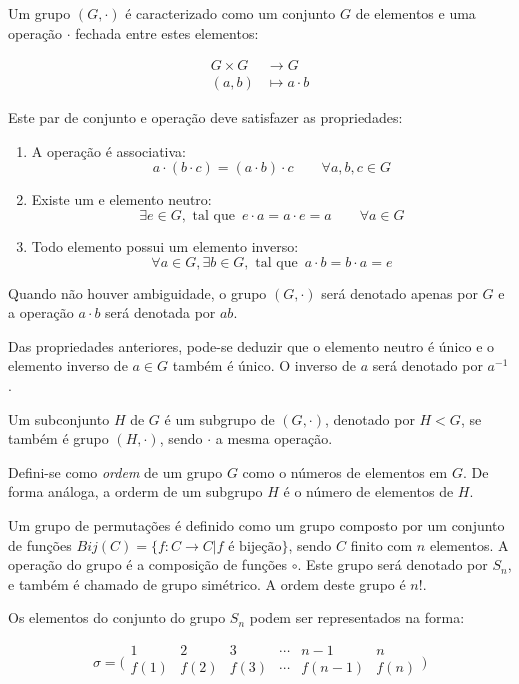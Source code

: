 \documentclass[a4paper,10pt,onecolumn]{article}
\begin{document}
Um grupo $(G,\cdot)$ é caracterizado como um conjunto $G$ de elementos e uma
operação $\cdot$ fechada entre estes elementos:

\begin{align*} G \times G & \rightarrow G \\ (a,b) & \mapsto a \cdot b
\end{align*}

  Este par de conjunto e operação deve satisfazer as propriedades:
\begin{enumerate}
\item A operação é associativa:\\
  $$ a \cdot ( b \cdot c) = ( a \cdot b) \cdot c \qquad \forall a,b,c \in G$$
\item Existe um e elemento neutro:\\
  $$ \exists e \in G, \textrm{ tal que }\, e \cdot a = a \cdot e = a \qquad \forall a \in G $$
\item Todo elemento possui um elemento inverso:\\
  $$ \forall a \in G, \exists b \in G,\textrm{ tal que }\, a \cdot b = b \cdot a = e $$
\end{enumerate}

Quando não houver ambiguidade, o grupo $(G,\cdot)$ será denotado apenas por
$G$ e a operação $a\cdot b$ será denotada por $ab$.

Das propriedades anteriores, pode-se deduzir que o elemento neutro é único e o
elemento inverso de $a \in G$ também é único.  O inverso de $a$ será denotado
por $a^{-1}$.

Um subconjunto $H$ de $G$ é um subgrupo de $(G,\cdot)$, denotado por $H < G$,
se também é grupo $(H,\cdot)$, sendo $\cdot$ a mesma operação.

Defini-se como \emph{ordem} de um grupo $G$ como o números de elementos em
$G$.  De forma análoga, a orderm de um subgrupo $H$ é o número de elementos de $H$.

Um grupo de permutações é definido como um grupo composto por um conjunto de
funções $Bij(C) = \{ f:C \rightarrow C| f \textrm{ é bijeção}\}$, sendo $C$
finito com $n$ elementos. A operação do grupo é a composição de funções
$\circ$.  Este grupo será denotado por $S_n$, e também é chamado de grupo
simétrico. A ordem deste grupo é $n!$.

Os elementos do conjunto do grupo $S_n$ podem ser representados na forma:

\begin{displaymath} \sigma= \bigl(
    \begin{smallmatrix} 1 & 2& 3& \cdots &n-1 &n \\ f(1) & f(2)& f(3)& \cdots
&f(n-1) &f(n) \\
    \end{smallmatrix} \bigr)
\end{displaymath}
\end{document}
